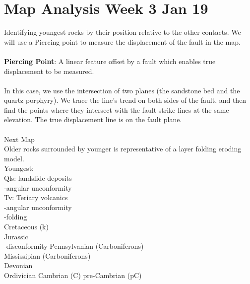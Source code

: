 \documentclass[12pt,a4paper]{report}
\begin{document}
\section*{Map Analysis Week 3 Jan 19}
Identifying youngest rocks by their position relative to the other contacts.
We will use a Piercing point to measure the displacement of the fault in the map.\\
\\
\textbf{Piercing Point}: A linear feature offset by a fault which enables true displacement to be measured.\\
\\
In this case, we use the intersection of two planes (the sandstone bed and the quartz porphyry).
We trace the line's trend on both sides of the fault, and then find the points where they intersect with the fault strike lines at the same elevation.
The true displacement line is on the fault plane.\\
\\
Next Map\\
Older rocks surrounded by younger is representative of a layer folding eroding model.\\
Youngest:\\
Qls: landslide deposits\\
-angular unconformity\\
Tv: Teriary volcanics\\
-angular unconformity\\
-folding\\
Cretaceous (k)\\
Jurassic\\
-disconformity
Pennsylvanian (Carboniferons)\\
Mississipian (Carboniferons)\\
Devonian\\
Ordivician
Cambrian (C)
pre-Cambrian (pC)



\end{document}
